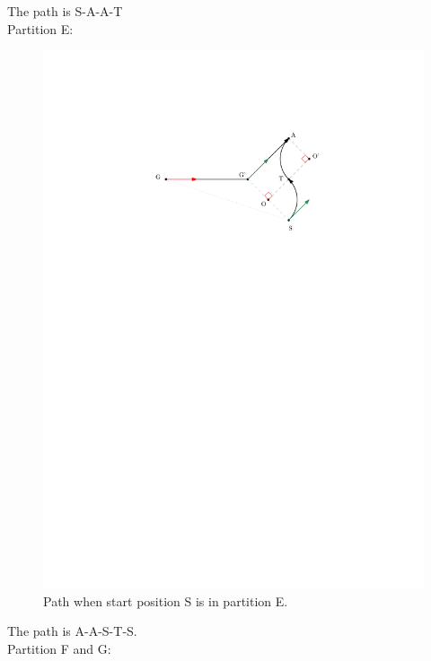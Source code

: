 \documentclass[12pt]{article}
\begin{document}
  The path is S-A-A-T\\
  
  Partition E:
  
  \begin{figure}
  \centering
  \includegraphics[scale=1]{Diff_Drive_Gene_Case_2}
  \caption{Path when start position S is in partition E.}
  \end{figure}

  The path is A-A-S-T-S. \\

  Partition F and G:
  
\end{document}
